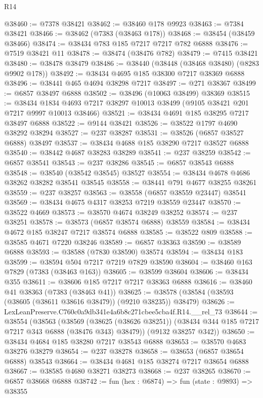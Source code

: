 \begin{lexlean}{R14}
\begin{coremodule}
@38460 := @7378 @38421
@38462 := @38460 @178 @9923
@38463 := @7384 @38421
@38466 := @38462 (@7383 (@38463 @178))
@38468 := @38454 (@38459 @38466)
@38474 := @38434 @783 @185 @7217 @7217 @782 @6888
@38476 := @7519 @38421 @11
@38478 := @38474 (@38476 @782)
@38479 := @7415 @38421
@38480 := @38478 @38479
@38486 := @38440 (@38448 (@38468 @38480) (@8283 @9902 @178))
@38492 := @38434 @4695 @185 @38300 @7217 @38369 @6888
@38496 := @38441 @465 @4694 @38298 @7217
@38497 := @271 @38367
@38499 := @6857 @38497 @6888
@38502 := @38496 (@10063 @38499) @38369
@38515 := @38434
    @1834
    @4693
    @7217
    @38297
    @10013
    @38499
    (@9105 @38421 @201 @7217 @9997 @10013 @38466)
@38521 := @38434 @4691 @185 @38295 @7217 @38497 @6888
@38522 := @9144 @38421
@38526 := @38522 @1797 @4690 @38292 @38294
@38527 := @237 @38287
@38531 := @38526 (@6857 @38527 @6888) @38497
@38537 := @38434 @4688 @185 @38290 @7217 @38527 @6888
@38540 := @38442 @4687 @38283 @38289
@38541 := @237 @38259
@38542 := @6857 @38541
@38543 := @237 @38286
@38545 := @6857 @38543 @6888
@38548 := @38540 (@38542 @38545) @38527
@38554 := @38434 @4678 @4686 @38262 @38282 @38541 @38545
@38558 := @38441 @791 @4677 @38255 @38261
@38559 := @237 @38257
@38563 := @38558 (@6857 @38559 @23447) @38541
@38569 := @38434 @4675 @4317 @38253 @7219 @38559 @23447
@38570 := @38522 @4669
@38573 := @38570 @4674 @38249 @38252
@38574 := @237 @38251
@38578 := @38573 (@6857 @38574 @6888) @38559
@38584 := @38434 @4672 @185 @38247 @7217 @38574 @6888
@38585 := @38522 @809
@38588 := @38585 @4671 @7220 @38246
@38589 := @6857 @38363
@38590 := @38589 @6888
@38593 := @38588 (@7830 @38590) @38574
@38594 := @38434 @183
@38599 := @38594 @504 @7217 @7219 @7829 @38590
@38604 := @38460 @163 @7829 (@7383 (@38463 @163))
@38605 := @38599 @38604
@38606 := @38434 @355
@38611 := @38606 @185 @7217 @7217 @38363 @6888
@38616 := @38460 @41 @38363 (@7383 (@38463 @41))
@38625 := @38578 (@38584 (@38593 (@38605 (@38611 @38616 @38479)) (@9210 @38235)) @38479)
@38626 := LexLeanPreserve.C760c0a9db341e4a6b8c271cbee5cba4f.R14.__rel_73
@38644 := @38554
    (@38563
      (@38569
        (@38625 (@38626 @38251))
        (@38434 @344 @185 @7217 @7217 @343 @6888 (@38476 @343) @38479))
      (@9132 @38257 @342))
@38650 := @38434 @4684 @185 @38280 @7217 @38543 @6888
@38653 := @38570 @4683 @38276 @38279
@38654 := @237 @38278
@38658 := @38653 (@6857 @38654 @6888) @38543
@38664 := @38434 @4681 @185 @38274 @7217 @38654 @6888
@38667 := @38585 @4680 @38271 @38273
@38668 := @237 @38265
@38670 := @6857 @38668 @6888
@38742 := fun (hex : @6874) =>
  fun (state : @9893) =>
  @38355

\end{coremodule}
\end{lexlean}
